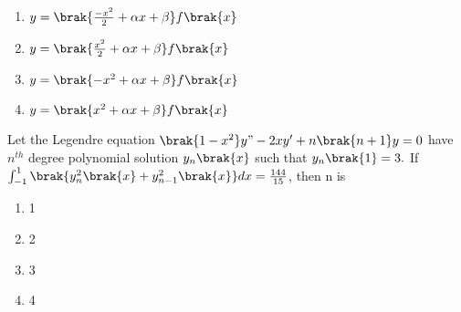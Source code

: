     \begin{enumerate}
        \item $y=\brak{\frac{-x^2}{2}+\alpha x+\beta}f\brak{x}$
        \item $y=\brak{\frac{x^2}{2}+\alpha x+\beta}f\brak{x}$
        \item $y=\brak{{-x^2}+\alpha x+\beta}f\brak{x}$
        \item $y=\brak{{x^2}+\alpha x+\beta}f\brak{x}$
    \end{enumerate}
    \item Let the Legendre equation $\brak{1-x^2}y"-2xy^{\prime}+n\brak{n+1}y=0$ have $n^{th}$ degree polynomial solution $y_n\brak{x}$ such that $y_n\brak{1}=3.$ If $\int_{-1}^{1}\brak{y^2_n\brak{x}+y^2_{n-1}\brak{x}}dx=\frac{144}{15}$, then n is
    \begin{enumerate}
        \item 1
        \item 2
        \item 3
        \item 4
    \end{enumerate}

